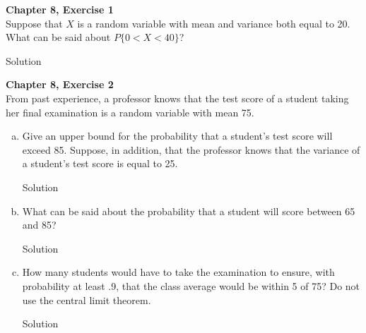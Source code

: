 \documentclass{article}
\begin{document}
\begin{spacing}{1.1}
\maketitle

\newpage
\begin{homeworkProblem}
  {\bf Chapter 8, Exercise 1}\\
  Suppose that $X$ is a random variable with mean and variance 
  both equal to 20. What can be said about $P\{ 0 < X < 40\}$?
  \begin{homeworkSection}{Solution}
    
  \end{homeworkSection}
\end{homeworkProblem}

\newpage
\begin{homeworkProblem}
  {\bf Chapter 8, Exercise 2}\\
  From past experience, a professor knows that the test score of a 
  student taking her final examination is a random variable with 
  mean 75.
  \begin{enumerate}[(a)]
    \item Give an upper bound for the probability that a student's 
    test score will exceed 85. 
    Suppose, in addition, that the professor knows that the variance 
    of a student's test score is equal to 25.
      \begin{homeworkSection}{Solution}
        
      \end{homeworkSection}
    \item What can be said about the probability that a student 
    will score between 65 and 85?
      \begin{homeworkSection}{Solution}
        
      \end{homeworkSection}
    \item How many students would have to take the examination to 
    ensure, with probability at least .9, that the class average 
    would be within 5 of 75? Do not use the central limit theorem.
      \begin{homeworkSection}{Solution}
        
      \end{homeworkSection}
  \end{enumerate}
\end{homeworkProblem}
  


\end{spacing}
\end{document}
